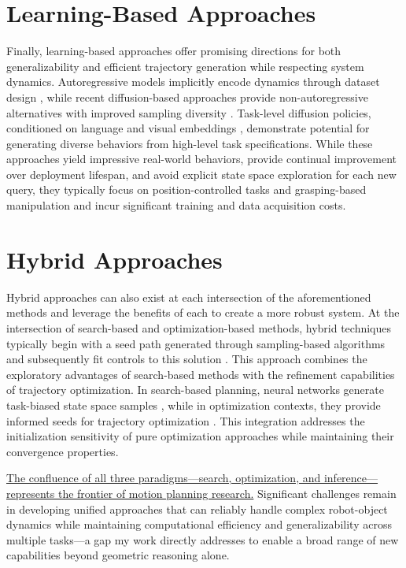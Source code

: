 \section{Learning-Based Approaches}
Finally, learning-based approaches offer promising directions for both generalizability and efficient trajectory generation while respecting system dynamics. Autoregressive models implicitly encode dynamics through dataset design \cite{fishman2023motion,qureshi2020motion}, while recent diffusion-based approaches provide non-autoregressive alternatives with improved sampling diversity \cite{carvalho2023motion,saha2024edmp}. Task-level diffusion policies, conditioned on language and visual embeddings \cite{ajay2023is,chi2023diffusionpolicy}, demonstrate potential for generating diverse behaviors from high-level task specifications.
While these approaches yield impressive real-world behaviors, provide continual improvement over deployment lifespan, and avoid explicit state space exploration for each new query, they typically focus on position-controlled tasks and grasping-based manipulation and incur significant training and data acquisition costs.

% 

\section{Hybrid Approaches}
Hybrid approaches can also exist at each intersection of the aforementioned methods and leverage the benefits of each to create a more robust system.
At the intersection of search-based and optimization-based methods, hybrid techniques typically begin with a seed path generated through sampling-based algorithms and subsequently fit controls to this solution \cite{kuntz2019fast}. This approach combines the exploratory advantages of search-based methods with the refinement capabilities of trajectory optimization.
In search-based planning, neural networks generate task-biased state space samples \cite{mcmahon2022survey}, while in optimization contexts, they provide informed seeds for trajectory optimization \cite{ichnowski2020deep}. This integration addresses the initialization sensitivity of pure optimization approaches while maintaining their convergence properties.

\ul{The confluence of all three paradigms---search, optimization, and inference---represents the frontier of motion planning research.}
Significant challenges remain in developing unified approaches that can reliably handle complex robot-object dynamics while maintaining computational efficiency and generalizability across multiple tasks---a gap my work directly addresses to enable a broad range of new capabilities beyond geometric reasoning alone.
